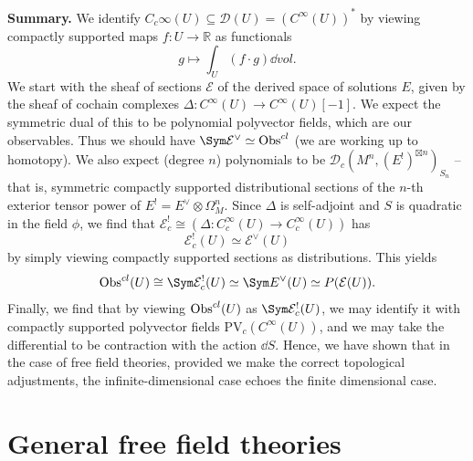 \textbf{Summary.} We identify $C_c\infty (U)\subseteq \mathcal{D} (U) = (C^\infty (U))^*$ by viewing compactly supported maps $f : U \to \mathbb{R} $ as functionals
\[
	g\mapsto \int_{U} (f\cdot g)\dd vol
.\]
We start with the sheaf of sections $\mathcal{E} $ of the derived space of solutions $E$, given by the sheaf of cochain complexes $\Delta : C^\infty (U)\to C^\infty (U)[-1]$. We expect the symmetric dual of this to be polynomial polyvector fields, which are our observables. Thus we should have $\Sym \mathcal{E} ^\vee \simeq \Obs^{cl} $ (we are working up to homotopy). We also expect (degree $n$) polynomials to be $\mathcal{D} _c\left( M^n, (E^!)^{\boxtimes n}  \right)_{S_n} $ -- that is, symmetric compactly supported distributional sections of the $n$-th exterior tensor power of $E^! = E^\vee \otimes \Omega _M^n$. Since $\Delta $ is self-adjoint and $S$ is quadratic in the field $\phi $, we find that $\mathcal{E} _c^! \cong \left(\Delta : C^\infty _c(U) \to C^\infty _c(U)\right)$ has
\[
	\mathcal{E} ^!_c(U) \simeq \mathcal{E} ^\vee (U)
\]
by simply viewing compactly supported sections as distributions. This yields
\[
	\Obs^{cl}(U) \cong \Sym \mathcal{E} ^!_c(U) \simeq \Sym E^\vee (U) \simeq P(\mathcal{E} (U))
.\]
Finally, we find that by viewing $\operatorname{Obs}^{cl} (U)$ as $\Sym \mathcal{E} ^!_c(U)$, we may identify it with compactly supported polyvector fields $\mathrm{PV} _c(C^\infty (U))$, and we may take the differential to be contraction with the action $\dd S$. Hence, we have shown that in the case of free field theories, provided we make the correct topological adjustments, the infinite-dimensional case echoes the finite dimensional case. 








\section{General free field theories}

